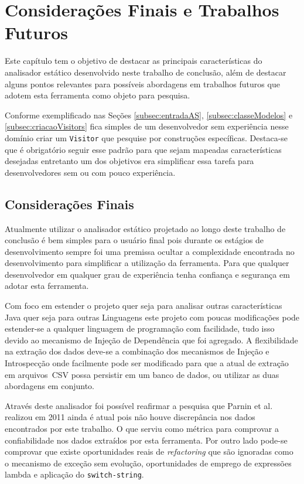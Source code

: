 \chapter{Considerações Finais e Trabalhos Futuros}
Este capítulo tem o objetivo de destacar as principais características do analisador estático desenvolvido neste trabalho de conclusão, além de destacar alguns pontos relevantes para possíveis abordagens em trabalhos futuros que adotem esta ferramenta como objeto para pesquisa.

Conforme exemplificado nas Seções \ref{subsec:entradaAS}, \ref{subsec:classeModelos} e \ref{subsec:criacaoVisitors} fica simples de um desenvolvedor sem experiência nesse domínio criar um \texttt{Visitor} que pesquise por construções específicas. Destaca-se que é obrigatório seguir esse padrão para que sejam mapeadas características desejadas entretanto um dos objetivos era simplificar essa tarefa para desenvolvedores sem ou com pouco experiência.
 
\section{Considerações Finais}
Atualmente utilizar o analisador estático projetado ao longo deste trabalho de conclusão é bem simples para o usuário final pois durante os estágios de desenvolvimento sempre foi uma premissa ocultar a complexidade encontrada no desenvolvimento para simplificar a utilização da ferramenta. Para que qualquer desenvolvedor em qualquer grau de experiência tenha confiança e segurança em adotar esta ferramenta.

Com foco em estender o projeto quer seja para analisar outras características Java quer seja para outras Linguagens este projeto com poucas modificações pode estender-se a qualquer linguagem de programação com facilidade, tudo isso devido ao mecanismo de Injeção de Dependência  que foi agregado. A flexibilidade na extração dos dados deve-se a combinação dos mecanismos de Injeção e Introspecção onde facilmente pode ser modificado para que a atual de extração em arquivos~\acs{CSV} possa persistir em um banco de dados, ou utilizar as duas abordagens em conjunto.

Através deste analisador foi possível reafirmar a pesquisa que Parnin et al.~\cite{Parnin:ACM2011} realizou em \num{2011} ainda é atual pois não houve discrepância nos dados encontrados por este trabalho. O que serviu como métrica para comprovar a confiabilidade nos dados extraídos por esta ferramenta. Por outro lado pode-se comprovar que existe oportunidades reais de \textit{refactoring} que são ignoradas como o mecanismo de exceção sem evolução, oportunidades de emprego de expressões lambda e aplicação do \texttt{switch-string}.

